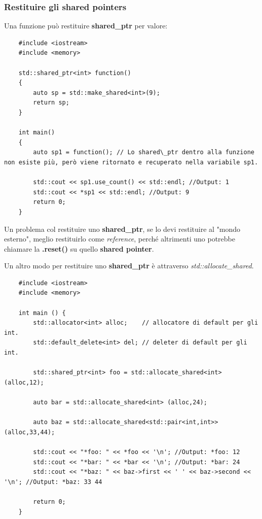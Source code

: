\subsubsection{Restituire gli shared pointers}

\textsf{\small Una funzione può restituire \textbf{shared\_ptr} per valore: } \\

\begin{lstlisting}
	#include <iostream>
	#include <memory>
	
	std::shared_ptr<int> function()
	{
		auto sp = std::make_shared<int>(9);
		return sp;
	}

	int main()
	{
		auto sp1 = function(); // Lo shared\_ptr dentro alla funzione non esiste più, però viene ritornato e recuperato nella variabile sp1.
		
		std::cout << sp1.use_count() << std::endl; //Output: 1
		std::cout << *sp1 << std::endl; //Output: 9
		return 0;
	}
\end{lstlisting}

\textsf{\small Un problema col restituire uno \textbf{shared\_ptr}, se lo devi restituire al "mondo esterno", meglio restituirlo come \emph{reference}, perché altrimenti uno potrebbe chiamare la \textbf{.reset()} su quello \textbf{shared pointer}.} \break

\textsf{\small Un altro modo per restituire uno \textbf{shared\_ptr} è attraverso \emph{std::allocate\_shared}.} \\

\begin{lstlisting}
	#include <iostream>
	#include <memory>
	
	int main () {
		std::allocator<int> alloc;    // allocatore di default per gli int.
		std::default_delete<int> del; // deleter di default per gli int.
		
		std::shared_ptr<int> foo = std::allocate_shared<int> (alloc,12);
		
		auto bar = std::allocate_shared<int> (alloc,24);
		
		auto baz = std::allocate_shared<std::pair<int,int>> (alloc,33,44);
		
		std::cout << "*foo: " << *foo << '\n'; //Output: *foo: 12
		std::cout << "*bar: " << *bar << '\n'; //Output: *bar: 24
		std::cout << "*baz: " << baz->first << ' ' << baz->second << '\n'; //Output: *baz: 33 44
		
		return 0;
	}
\end{lstlisting}

